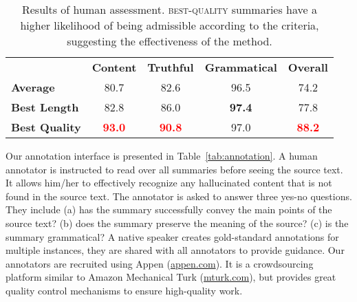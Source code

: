 \documentclass[11pt]{article}
\begin{document}
\begin{table}[t]
\centering
\setlength{\tabcolsep}{5pt}
\renewcommand{\arraystretch}{1.15}
\begin{fontpbk}
\begin{scriptsize}
\begin{tabular}{|l|cccc|}
\hline
& \textbf{Content} & \textbf{Truthful} & \textbf{Grammatical} & \textbf{Overall}\\
\hdashline
\textbf{Average} & 80.7 & 82.6 & 96.5 & 74.2 \\
\textbf{Best Length} & 82.8 & 86.0 & \textbf{97.4} & 77.8 \\
\textbf{Best Quality} & \textcolor{red}{\textbf{93.0}} & \textcolor{red}{\textbf{90.8}} & 97.0 & \textcolor{red}{\textbf{88.2}} \\
\hline
\end{tabular}
\end{scriptsize}
\end{fontpbk}
\caption{
Results of human assessment.
\textsc{best-quality} summaries have a higher likelihood of being admissible according to the criteria, suggesting the effectiveness of the method. 
}
\label{tab:results_human}
\vspace{-0.1in}
\end{table}


Our annotation interface is presented in Table~\ref{tab:annotation}.
A human annotator is instructed to read over all summaries before seeing the source text.
It allows him/her to effectively recognize any hallucinated content that is not found in the source text.
The annotator is asked to answer three yes-no questions. 
They include (a) has the summary successfully convey the main points of the source text? (b) does the summary preserve the meaning of the source? (c) is the summary grammatical?
A native speaker creates gold-standard annotations for multiple instances, they are shared with all annotators to provide guidance.
Our annotators are recruited using Appen (\url{appen.com}). It is a crowdsourcing platform similar to Amazon Mechanical Turk (\url{mturk.com}), but provides great quality control mechanisms to ensure high-quality work.
\end{document}
